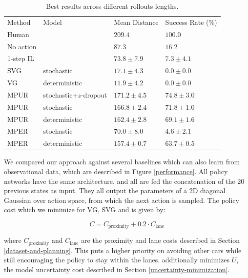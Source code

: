 \documentclass{article} %
\begin{document}
  \begin{table}[t]
    \centering
  \begin{tabular}{|ll|ll|}
    \hline
    Method & Model & Mean Distance & Success Rate (\%)  \\
    \hhline{|====|}
    Human & & $209.4$ & $100.0$ \\
    \hline
    No action & & $87.3$ & $16.2$ \\
    \hline
    1-step IL & & $73.8 \pm 7.9$ & $7.3 \pm 4.1$ \\
    \hline
    SVG & stochastic & $17.1 \pm 4.3$ & $0.0 \pm 0.0$ \\
    VG & deterministic & $11.9 \pm 4.2$ & $0.0 \pm 0.0$ \\
    \hline
    MPUR & stochastic+$z$-dropout & $171.2 \pm 4.5$ & $74.8 \pm 3.0$ \\
    MPUR & stochastic & $166.8 \pm 2.4$ & $71.8 \pm 1.0$ \\
    MPUR & deterministic & $162.4 \pm 2.8$ & $69.1 \pm 1.6$ \\
    MPER & stochastic & $70.0 \pm 8.0$ & $4.6 \pm 2.1$ \\
    MPER & deterministic & $157.4 \pm 0.7$ & $63.7 \pm 0.5$ \\
    \hline
  \end{tabular}
  \label{main-table}
  \caption{Best results across different rollouts lengths.} 
  \end{table}
    

    We compared our approach against several baselines which can also learn from observational data, which are described in Figure \ref{performance}.
    All policy networks have the same architecture, and all are fed the concatenation of the 20 previous states as input. They all output the parameters of a 2D diagonal Gaussian over action space, from which the next action is sampled.
    The policy cost which we minimize for VG, SVG and \modelnamedrop is given by:

    \begin{equation}
      C = C_{\text{proximity}} + 0.2 \cdot C_\text{lane}
    \end{equation}

    where $C_{\text{proximity}}$ and $C_\text{lane}$ are the proximity and lane costs described in Section \ref{dataset-and-planning}. This puts a higher priority on avoiding other cars while still encouraging the policy to stay within the lanes. \modelnamedrop additionally minimizes $U$, the model uncertainty cost described in Section \ref{uncertainty-minimization}.
\end{document}

